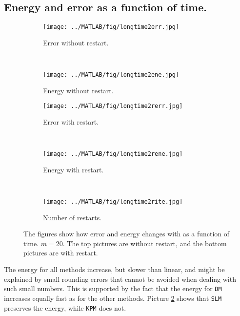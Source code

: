 \subsection{ Energy and error as a function of time. } %

\begin{figure}[H]
        \centering
        \begin{subfigure}[b]{0.3\textwidth}
                \texttt{[image: ../MATLAB/fig/longtime2err.jpg]}
                \caption{ Error without restart. }
                \label{fig:longtime2err}
        \end{subfigure}
        ~
        \begin{subfigure}[b]{0.3\textwidth}
                \texttt{[image: ../MATLAB/fig/longtime2ene.jpg]}
                \caption{ Energy without restart. }
                \label{fig:longtime8err}
        \end{subfigure}
        
        \begin{subfigure}[b]{0.3\textwidth}
                \texttt{[image: ../MATLAB/fig/longtime2rerr.jpg]}
                \caption{ Error with restart. }
                \label{fig:longtime2rerr}
        \end{subfigure}
        ~
        \begin{subfigure}[b]{0.3\textwidth}
                \texttt{[image: ../MATLAB/fig/longtime2rene.jpg]}
                \caption{ Energy with restart. }
                \label{fig:longtime8rerr}
        \end{subfigure}
        ~
        \begin{subfigure}[b]{0.3\textwidth}
                \texttt{[image: ../MATLAB/fig/longtime2rite.jpg]}
                \caption{ Number of restarts. }
                \label{fig:longtime2rene}
        \end{subfigure}
        \caption{ The figures show how error and energy changes with as a function of time. $m = 20$. The top pictures are without restart, and the bottom pictures are with restart. }
        \label{fig:SLMenergyerror0}
\end{figure}
The energy for all methods increase, but slower than linear, and might be explained by small rounding errors that cannot be avoided when dealing with such small numbers. This is supported by the fact that the energy for \texttt{DM} increases equally fast as for the other methods. Picture \ref{fig:longtime8err} shows that \texttt{SLM} preserves the energy, while \texttt{KPM} does not.


